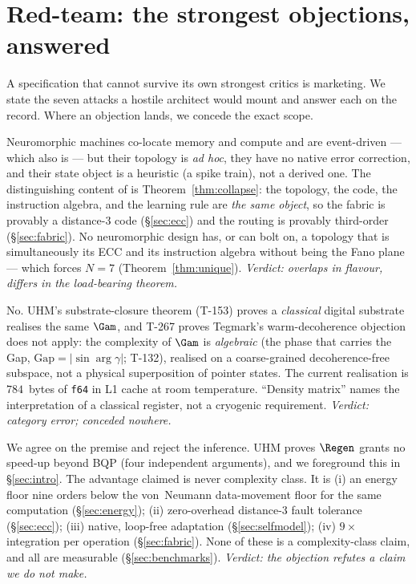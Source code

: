 \section{Red-team: the strongest objections, answered}
\label{sec:redteam}

A specification that cannot survive its own strongest critics is marketing.
We state the seven attacks a hostile architect would mount and answer each on
the record. Where an objection lands, we concede the exact scope.

\begin{redteambox}
Neuromorphic machines co-locate memory and compute and are event-driven ---
which \TALOS{} also is --- but their topology is \emph{ad hoc}, they have no
native error correction, and their state object is a heuristic (a spike
train), not a derived one. The distinguishing content of \TALOS{} is
Theorem~\ref{thm:collapse}: the topology, the code, the instruction algebra,
and the learning rule are \emph{the same object}, so the fabric is provably a
distance-3 code (\S\ref{sec:ecc}) and the routing is provably third-order
(\S\ref{sec:fabric}). No neuromorphic design has, or can bolt on, a topology
that is simultaneously its ECC and its instruction algebra without being the
Fano plane --- which forces $N=7$ (Theorem~\ref{thm:unique}). \emph{Verdict:
overlaps in flavour, differs in the load-bearing theorem.}
\end{redteambox}

\begin{redteambox}
No. UHM's substrate-closure theorem (T-153) proves a \emph{classical} digital
substrate realises the same $\Gam$, and T-267 proves Tegmark's warm-decoherence
objection does not apply: the complexity of $\Gam$ is \emph{algebraic} (the
phase that carries the Gap, $\mathrm{Gap}=|\sin\arg\gamma|$; T-132), realised
on a coarse-grained decoherence-free subspace, not a physical superposition
of pointer states. The current \SYNARC{} realisation is $784$~bytes of
\texttt{f64} in L1 cache at room temperature. ``Density matrix'' names the
interpretation of a classical register, not a cryogenic requirement.
\emph{Verdict: category error; conceded nowhere.}
\end{redteambox}

\begin{redteambox}
We agree on the premise and reject the inference. UHM proves $\Regen$ grants
no speed-up beyond BQP (four independent arguments), and we foreground this in
\S\ref{sec:intro}. The advantage claimed is never complexity class. It is
(i) an energy floor nine orders below the von~Neumann data-movement floor for
the same computation (\S\ref{sec:energy}); (ii) zero-overhead distance-3 fault
tolerance (\S\ref{sec:ecc}); (iii) native, loop-free adaptation
(\S\ref{sec:selfmodel}); (iv) $9\times$ integration per operation
(\S\ref{sec:fabric}). None of these is a complexity-class claim, and all are
measurable (\S\ref{sec:benchmarks}). \emph{Verdict: the objection refutes a
claim we do not make.}
\end{redteambox}

